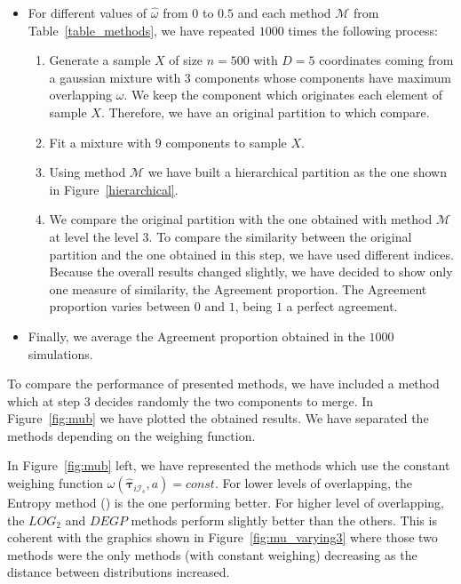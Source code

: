 \documentclass[10pt, a4paper]{article}
\newcommand{\m}[1]{\boldsymbol{#1}}
\begin{document}
\begin{itemize}
\item For different values of $\hat{\omega}$ from $0$ to $0.5$ and each method $\mathcal{M}$ from Table~\ref{table_methods},  we  have repeated $1000$ times the following process:
\begin{enumerate}
\item Generate a sample $X$ of size $n=500$ with $D=5$ coordinates coming from a gaussian mixture with $3$ components whose components have maximum overlapping $\omega$. We keep the component which originates each element of sample $X$. Therefore, we have an original partition to which compare.
\item Fit a mixture with 9 components to sample $X$.
\item Using method $\mathcal{M}$ we have built a hierarchical partition as the one shown in Figure~\ref{hierarchical}.
\item We compare the original partition with the one obtained with method $\mathcal{M}$ at level the level $3$. To compare the similarity between the original partition and the one obtained in this step, we have used different indices. Because the overall results changed slightly, we have decided to show only one measure of similarity, the Agreement proportion. The Agreement proportion varies between $0$ and $1$, being $1$ a perfect agreement.
\end{enumerate}
\item Finally, we average the Agreement proportion obtained in the $1000$ simulations.
\end{itemize}

To compare the performance of presented methods, we have included a method which at step $3$ decides randomly the two components to merge. In Figure~\ref{fig:mub} we have plotted the obtained results. We have separated the methods depending on the weighing function.

In Figure~\ref{fig:mub} left, we have represented the methods which use the constant weighing function $\omega(\hat{\m \tau}_{i \mathcal{I}_s}, a) = const$. For lower levels of overlapping, the Entropy method (\cite{baudry2010combining}) is the one performing better. For higher level of overlapping, the $LOG_2$ and $DEGP$ methods perform slightly better than the others. This is coherent with the graphics shown in Figure~\ref{fig:mu_varying3} where those two methods were the only methods (with constant weighing) decreasing as the distance between distributions increased.
\end{document}
